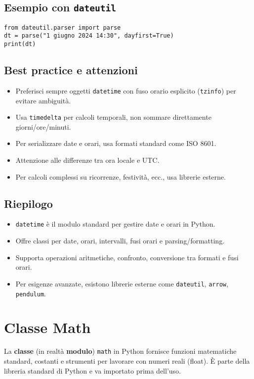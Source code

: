 \documentclass[a4paper,12pt]{article}
\begin{document}
\subsection*{Esempio con \texttt{dateutil}}
\begin{lstlisting}
from dateutil.parser import parse
dt = parse("1 giugno 2024 14:30", dayfirst=True)
print(dt)
\end{lstlisting}

\subsection*{Best practice e attenzioni}
\begin{itemize}
    \item Preferisci sempre oggetti \texttt{datetime} con fuso orario esplicito (\texttt{tzinfo}) per evitare ambiguità.
    \item Usa \texttt{timedelta} per calcoli temporali, non sommare direttamente giorni/ore/minuti.
    \item Per serializzare date e orari, usa formati standard come ISO 8601.
    \item Attenzione alle differenze tra ora locale e UTC.
    \item Per calcoli complessi su ricorrenze, festività, ecc., usa librerie esterne.
\end{itemize}

\subsection*{Riepilogo}
\begin{itemize}
    \item \texttt{datetime} è il modulo standard per gestire date e orari in Python.
    \item Offre classi per date, orari, intervalli, fusi orari e parsing/formatting.
    \item Supporta operazioni aritmetiche, confronto, conversione tra formati e fusi orari.
    \item Per esigenze avanzate, esistono librerie esterne come \texttt{dateutil}, \texttt{arrow}, \texttt{pendulum}.
\end{itemize}

\section{Classe Math}
La \textbf{classe} (in realtà \textbf{modulo}) \texttt{math} in Python fornisce funzioni matematiche standard, costanti e strumenti per lavorare con numeri reali (float). È parte della libreria standard di Python e va importato prima dell'uso.
\end{document}
